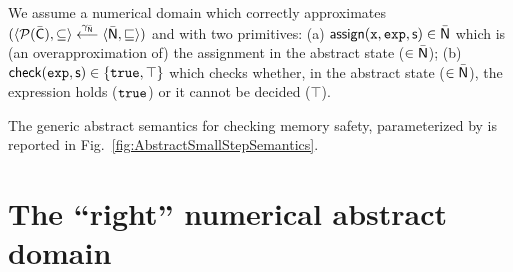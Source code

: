 \documentclass[10pt]{sigplanconf}
\newcommand{\fcomment}[1]{{}}
\begin{document}
We assume a numerical domain  which correctly approximates \parti{\Adomf} $(\langle \mathcal{P}{(\bar{\mathsf{C}})},\allowbreak \subseteq \rangle \stackrel{\gamma_{\bar{\mathsf{N}}}}{\longleftarrow} \langle \bar{\mathsf{N}}, {\sqsubseteq} \rangle)$ and with two primitives:
(a)  $\mathsf{assign}(\mathtt{x},\allowbreak \mathtt{exp}, \allowbreak\mathsf{\mathsf{s}}) \in \bar{\mathsf{N}}$ which is (an overapproximation of) the assignment  in the abstract state  ($\in \bar{\mathsf{N}}$);
 (b) $\mathsf{check}(\mathtt{exp},\allowbreak \mathsf{\mathsf{s}}) \in \{\mathtt{true}, \top \}$ which checks whether, in the abstract state  ($\in \bar{\mathsf{N}}$), the expression  holds ($\mathtt{true}$) or it cannot be decided ($\top$).


\fcomment{
This approximation is parameterized on an abstract numerical domain used to catch information on numerical variables.
As we do not define here any numerical domains (we will propose in the next section a relational domain particularly focused on the analysis of memory accesses), we need that some functions that deal with the abstract numerical domain \adom{N} are provided:
\begin{itemize}
\item $\mathtt{assign}: \funzione{\variables \times \variables \times \Adoms}{\Adoms}$ assigns the value of the second variable to the first one;
\item $\mathtt{check} \in \funzione{\expressions \times \Adoms}{\{\true, \false, \top \}}$ checks on the abstract domain if the expression is validated.
\end{itemize}
}

The generic abstract semantics for checking memory safety, parameterized by  is reported in Fig.~\ref{fig:AbstractSmallStepSemantics}.



\section{The ``right''  numerical  abstract domain}
\end{document}
